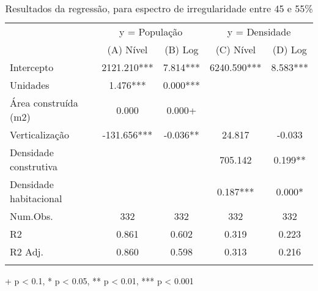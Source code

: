 \begin{table}[h]
\caption{Resultados da regressão, para espectro de irregularidade entre 45 e 55\%} 
\fontsize{12.0pt}{14.4pt}\selectfont
\begin{tabular*}{\linewidth}{@{\extracolsep{\fill}}lcccc}
\toprule
 & \multicolumn{2}{c}{y = População} & \multicolumn{2}{c}{y = Densidade} \\ 
\cmidrule(lr){2-3} \cmidrule(lr){4-5}
  & (A) Nível & (B) Log & (C) Nível & (D) Log \\ 
\midrule\addlinespace[2.5pt]
Intercepto & 2121.210*** & 7.814*** & 6240.590*** & 8.583*** \\ 
Unidades & 1.476*** & 0.000*** &  &  \\ 
Área construída (m2) & 0.000 & 0.000+ &  &  \\ 
Verticalização & -131.656*** & -0.036** & 24.817 & -0.033 \\ 
Densidade construtiva &  &  & 705.142 & 0.199** \\ 
{Densidade habitacional} & {} & {} & {0.187***} & {0.000*} \\ 
\midrule
Num.Obs. & 332 & 332 & 332 & 332 \\ 
R2 & 0.861 & 0.602 & 0.319 & 0.223 \\ 
R2 Adj. & 0.860 & 0.598 & 0.313 & 0.216 \\ 
\bottomrule\vspace{0pt}
\end{tabular*}
\label{tab:regressao-1}
\begin{minipage}{\linewidth}
+ p < 0.1, * p < 0.05, ** p < 0.01, *** p < 0.001\\
\end{minipage}
\end{table}

